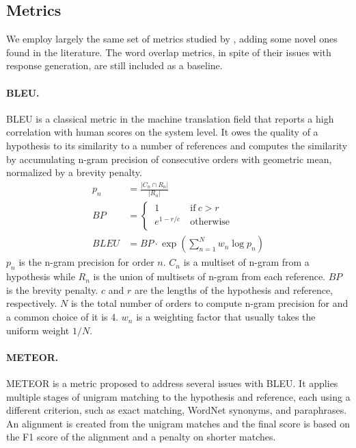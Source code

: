 \documentclass[runningheads]{llncs}
\begin{document}
    \subsection{Metrics}
    We employ largely the same set of metrics studied by \cite{HowNot}, adding some novel ones found in the literature. The word overlap metrics, in spite of their issues with response generation, are still included as a baseline.

    \paragraph{BLEU.}
    BLEU \cite{BLEU} is a classical metric in the machine translation field that reports a high correlation with human scores on the system level. It owes the quality of a hypothesis to its similarity to a number of references and computes the similarity by accumulating n-gram precision of consecutive orders with geometric mean, normalized by a brevity penalty.
    \begin{align}
        p_n &= \frac{ |C_n \cap R_n| }{ |R_n| } \\
        \textit{BP} &=
        \begin{cases}
            \ 1 \ & \text{if} \  c > r \\
            \ e^{1 - r/c} \ & \text{otherwise} \\
        \end{cases} \\
        \textit{BLEU} &=
        \textit{BP} \cdot \exp \left( \sum_{n=1}^N w_n \log p_n \right)
    \end{align}
    $p_n$ is the n-gram precision for order $n$. $C_n$ is a multiset of n-gram from a hypothesis while $R_n$ is the union of multisets of n-gram from each reference. $\textit{BP}$ is the brevity penalty. $c$ and $r$ are the lengths of the hypothesis and reference, respectively. $N$ is the total number of orders to compute n-gram precision for and a common choice of it is 4. $w_n$ is a weighting factor that usually takes the uniform weight $1 / N$.

    \paragraph{METEOR.}
    METEOR \cite{METEOR} is a metric proposed to address several issues with BLEU. It applies multiple stages of unigram matching to the hypothesis and reference, each using a different criterion, such as exact matching, WordNet synonyms, and paraphrases. An alignment is created from the unigram matches and the final score is based on the F1 score of the alignment and a penalty on shorter matches.
\end{document}
